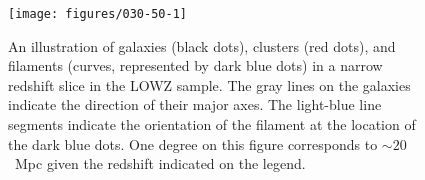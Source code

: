 \documentclass[usenatbib,useAMS]{mnras}
\theoremstyle{remark}
\newcommand{\sukhdeep}[1]{{\textcolor{magenta}{SS: #1}}}
\newcommand{\rachel}[1]{{\textcolor{cyan}{RM: #1}}}
\begin{document}
        \begin{figure}
	        \texttt{[image: figures/030-50-1]}
    	    \caption{
        	An illustration of galaxies (black dots), clusters (red dots), and filaments (curves, represented by dark blue dots)
	        in a narrow redshift slice in the LOWZ sample. 
    	    The gray lines on the galaxies indicate the direction of their major axes.
        	The light-blue line segments indicate the orientation of the filament at the location of
            the dark blue dots. 
            One degree on this figure corresponds to $\sim 20$~Mpc given the redshift indicated on
            the legend.
	        }
    	    \label{eq::ex02}
        \end{figure}
        
\end{document}

